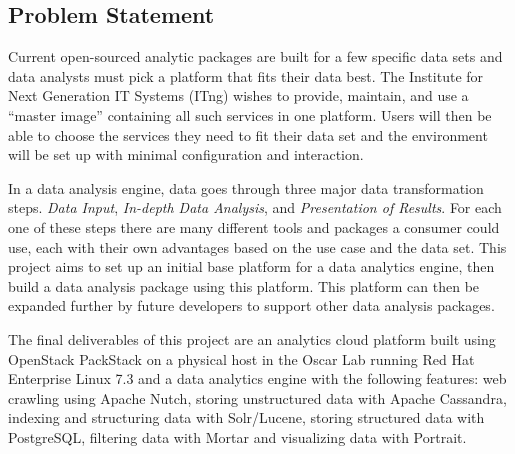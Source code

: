 \subsection{Problem Statement}
\label{sec:problem}

Current open-sourced analytic packages are built for a few specific data
sets and data analysts must pick a platform that fits their data best. The
Institute for Next Generation IT Systems (ITng) wishes to provide,
maintain, and use a ``master image'' containing all such services in one
platform. Users will then be able to choose the services they need to fit
their data set and the environment will be set up with minimal
configuration and interaction.

In a data analysis engine, data goes through three major data 
transformation steps. \textit{Data Input}, \textit{In-depth Data Analysis},
and \textit{Presentation of Results}. For each one of these steps there are
many different tools and packages a consumer could use, each with their
own advantages based on the use case and the data set. This project aims
to set up an initial base platform for a data analytics engine, then build 
a data analysis package using this platform. This platform can then be 
expanded further by future developers to support other data analysis
packages.

The final deliverables of this project are an analytics cloud platform built
using OpenStack PackStack on a physical host in the Oscar Lab running Red
Hat Enterprise Linux 7.3 and a data analytics engine with the following
features: web crawling using Apache Nutch, storing unstructured data
with Apache Cassandra, indexing and structuring data with Solr/Lucene,
storing structured data with PostgreSQL, filtering data with Mortar and
visualizing data with Portrait. 
